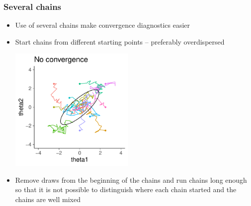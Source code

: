 \documentclass[10pt]{beamer}
\begin{document}
\begin{frame}

\frametitle{ Several chains}

  \vspace{-0.5\baselineskip}
  \begin{itemize}
  \item Use of several chains make convergence diagnostics easier
    \item Start chains from different starting points -- preferably overdispersed
      \begin{center}
  \vspace{-0.5\baselineskip}
      \includegraphics[width=6cm]{figs/10chains1.pdf}
    \end{center}
  \vspace{-0.5\baselineskip}
    \item<2-> Remove draws from the beginning of the chains and run
      chains long enough so that it is not possible to distinguish
      where each chain started and the chains are well mixed
  \end{itemize}

\end{frame}
\end{document}

